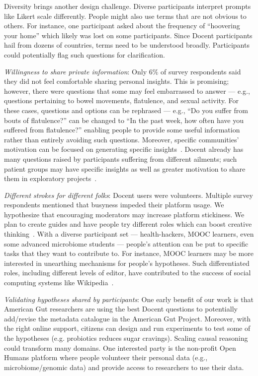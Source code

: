 Diversity brings another design challenge. Diverse participants interpret prompts like Likert scale differently. People might also use terms that are not obvious to others. For instance, one participant asked about the frequency of “hoovering your home” which likely was lost on some participants. Since Docent participants hail from dozens of countries, terms need to be understood broadly. Participants could potentially flag such questions for clarification. 

\textit{Willingness to share private information}: Only 6\% of survey respondents said they did not feel comfortable sharing personal insights. This is promising; however, there were questions that some may feel embarrassed to answer — e.g., questions pertaining to bowel movements, flatulence, and sexual activity. For these cases, questions and options can be rephrased — e.g., “Do you suffer from bouts of flatulence?” can be changed to “In the past week, how often have you suffered from flatulence?” enabling people to provide some useful information rather than entirely avoiding such questions. Moreover, specific communities’ motivation can be focused on generating specific insights~\cite{Chandler2013}. Docent already has many questions raised by participants suffering from different ailments; such patient groups may have specific insights as well as greater motivation to share them in exploratory projects~\cite{Karkar2017a}.

\textit{Different strokes for different folks}: Docent users were volunteers. Multiple survey respondents mentioned that busyness impeded their platform usage. We hypothesize that encouraging moderators may increase platform stickiness. We plan to create guides and have people try different roles which can boost creative thinking~\cite{Teevan:2017:BWC:3059454.3059467}. With a diverse participant set — health-hackers, MOOC learners, even some advanced microbiome students — people’s attention can be put to specific tasks that they want to contribute to. For instance, MOOC learners may be more interested in unearthing mechanisms for people’s hypotheses. Such differentiated roles, including different levels of editor, have contributed to the success of social computing systems like Wikipedia~\cite{Krieger2009}.

\textit{Validating hypotheses shared by participants}: One early benefit of our work is that American Gut researchers are using the best Docent questions to potentially add/revise the metadata catalogue in the American Gut Project. Moreover, with the right online support, citizens can design and run experiments to test some of the hypotheses (e.g. probiotics reduces sugar cravings). Scaling causal reasoning could transform many domains. One interested party is the non-profit Open Humans platform where people volunteer their personal data (e.g., microbiome/genomic data) and provide access to researchers to use their data.

